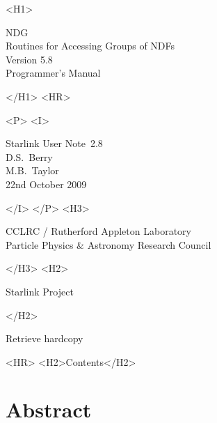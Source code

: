 \documentclass[twoside,11pt]{article}
\newcommand{\stardoccategory}  {Starlink User Note}
\newcommand{\stardocsource}    {sun\stardocnumber}
\newcommand{\stardocnumber}    {2.8}
\newcommand{\stardocauthors}   {D.S.\ Berry \\ M.B.\ Taylor}
\newcommand{\stardocdate}      {22nd October 2009}
\newcommand{\stardoctitle}     {NDG \\ [\latex{1ex}]
                                Routines for Accessing Groups of NDFs}
\newcommand{\stardocversion}   {Version 5.8}
\newcommand{\stardocmanual}    {Programmer's Manual}
\newcommand{\htmladdnormallink}[2]{#1}
\newcommand{\htmladdimg}[1]{}
\newcommand{\htmlref}[2]{#1}
\newcommand{\htmladdtonavigation}[1]{}
\newcommand{\latex}[1]{#1}
\newcommand{\xlabel}[1]{}
\renewcommand{\_}{\texttt{\symbol{95}}}
\begin{document}
\begin{htmlonly}
   \xlabel{}
   \begin{rawhtml} <H1> \end{rawhtml}
      \stardoctitle\\
      \stardocversion\\
      \stardocmanual
   \begin{rawhtml} </H1> <HR> \end{rawhtml}


   \begin{rawhtml} <P> <I> \end{rawhtml}
   \stardoccategory\ \stardocnumber \\
   \stardocauthors \\
   \stardocdate
   \begin{rawhtml} </I> </P> <H3> \end{rawhtml}
      \htmladdnormallink{CCLRC / Rutherford Appleton Laboratory}
                        {http://www.cclrc.ac.uk} \\
      \htmladdnormallink{Particle Physics \& Astronomy Research Council}
                        {http://www.pparc.ac.uk} \\
   \begin{rawhtml} </H3> <H2> \end{rawhtml}
      \htmladdnormallink{Starlink Project}{http://www.starlink.ac.uk/}
   \begin{rawhtml} </H2> \end{rawhtml}
   \htmladdnormallink{\htmladdimg{source.gif} Retrieve hardcopy}
      {http://www.starlink.ac.uk/cgi-bin/hcserver?\stardocsource}\\

  \label{stardoccontents}
  \begin{rawhtml}
    <HR>
    <H2>Contents</H2>
  \end{rawhtml}
  \htmladdtonavigation{\htmlref{\htmladdimg{contents_motif.gif}}
        {stardoccontents}}

  \section{\xlabel{abstract}Abstract}
\end{htmlonly}
\end{document}
